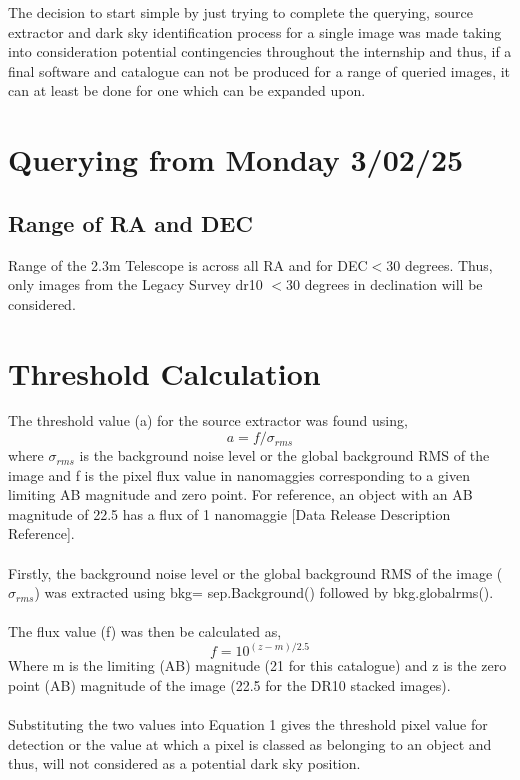 \documentclass{article}
\begin{document}
The decision to start simple by just trying to complete the querying, source extractor and dark sky identification process for a single image was made taking into consideration potential contingencies throughout the internship and thus, if a final software and catalogue can not be produced for a range of queried images, it can at least be done for one which can be expanded upon.

\section{Querying from Monday 3/02/25}
\subsection{Range of RA and DEC}
Range of the 2.3m Telescope is across all RA and for DEC$<$30 degrees. 
Thus, only images from the Legacy Survey dr10 $<$30 degrees in declination will be considered.

\section{Threshold Calculation}
The threshold value (a) for the source extractor was found using, \begin{equation} a=f/\sigma_{rms} \end{equation}
where $\sigma_{rms}$ is the background noise level or the global background RMS of the image and f is the pixel flux value in nanomaggies corresponding to a given limiting AB magnitude and zero point. For reference, an object with an AB magnitude of 22.5 has a flux of 1 nanomaggie [Data Release Description Reference].\\
\\Firstly, the background noise level or the global background RMS of the image ($\sigma_{rms}$) was extracted using bkg= sep.Background() followed by bkg.globalrms(). \\
\\The flux value (f) was then be calculated as,  \begin{equation} 
f=10^{(z-m)/2.5}
\end{equation} 
Where m is the limiting (AB) magnitude (21 for this catalogue) and z is the zero point (AB) magnitude of the image (22.5 for the DR10 stacked images). \\
\\ 
Substituting the two values into Equation 1 gives the threshold pixel value for detection or the value at which a pixel is classed as belonging to an object and thus, will not considered as a potential dark sky position.
\end{document}
